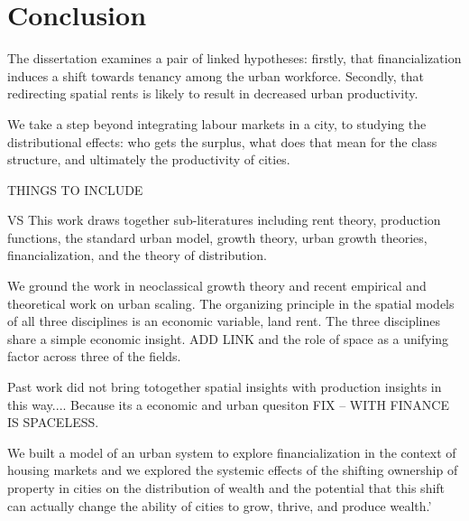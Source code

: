 \chapter{Conclusion} \label{chapter-conclusions}

The dissertation examines a pair of linked hypotheses: firstly, that financialization induces a shift towards tenancy among the urban workforce.  Secondly, that redirecting spatial rents is likely to result in decreased urban productivity. 

 We take a step beyond integrating labour markets in a city, to studying the distributional effects: who gets the surplus, what does that mean for the class structure, and ultimately the productivity of cities. 






THINGS TO INCLUDE


VS  This work draws together sub-literatures including rent theory, production functions, the standard urban model, growth theory, urban growth theories, financialization, and the theory of distribution. %

We ground the work in  \gls{neoclassical growth theory} and recent empirical and theoretical work on \gls{urban scaling}. 
 The organizing principle in the spatial models of all three disciplines is an economic variable, land rent.  The three disciplines share a simple economic insight.  ADD LINK
and the role of space as a unifying factor across three of the fields. 


Past work did not  bring totogether spatial insights with production insights in this way.... Because its a economic and urban quesiton FIX  -- WITH FINANCE IS SPACELESS.

We built a model of an urban system to explore financialization in the context of housing markets and we explored the systemic effects of the shifting ownership of property in cities on the distribution of wealth and the potential that this shift can actually change the ability of cities to grow, thrive, and produce wealth.'

